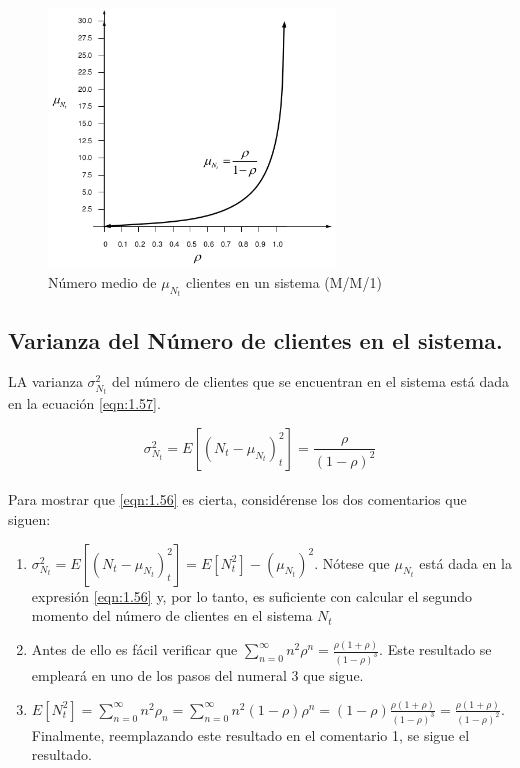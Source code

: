 \begin{figure}[H]
\centering
\includegraphics[width=3in]{chapters/chapter3/figures/Figura1-7:Numeromediodeclientesenunsistema.png}
\caption[Número medio de $ \mu_{N_{t}} $ clientes en un sistema (M/M/1)]{Número medio de $ \mu_{N_{t}} $ clientes en un sistema (M/M/1)}
\label{fig:mesh7}
\end{figure}    

\subsection{Varianza del Número de clientes en el sistema.}

LA varianza $ \sigma_{N_{t}}^{2} $ del número de clientes que se encuentran en el sistema está dada en la ecuación \ref{eqn:1.57}. 

\begin{equation}
    \sigma_{N_{t}}^{2}=E\left [ \left ( N_{t}-\mu _{N_{t}} \right )_{t}^{2} \right ]=\frac{\rho}{\left ( 1- \rho \right )^{2}}
    \label{eqn:1.57}
\end{equation}
\\
Para mostrar que \ref{eqn:1.56} es cierta, considérense los dos comentarios que siguen:

\begin{enumerate}
    \item $ \sigma_{N_{t}}^{2}=E\left [ \left ( N_{t}-\mu _{N_{t}} \right )_{t}^{2} \right ]= E\left [ N_{t}^{2} \right ]-\left ( \mu _{N_{t}} \right )^{2} $. Nótese que $ \mu _{N_{t}} $ está dada en la expresión \ref{eqn:1.56} y, por lo tanto, es suficiente con calcular el segundo momento del número de clientes en el sistema $ N_{t} $
    \item Antes de ello es fácil verificar que $ \displaystyle\sum_{n=0}^{\infty }n^{2}\rho^{n}=\frac{\rho \left ( 1+\rho \right )}{\left ( 1-\rho \right )^{3}} $. Este resultado se empleará en uno de los pasos del numeral 3 que sigue.
    \item $ E\left [ N_{t}^{2} \right ] = \displaystyle\sum_{n=0}^{\infty }n^{2}\rho_{n}= \sum_{n=0}^{\infty }n^{2}\left ( 1- \rho \right )\rho^{n}= \left ( 1- \rho \right )\frac{\rho \left ( 1+\rho \right )}{\left ( 1-\rho \right )^{3}}=\frac{\rho \left ( 1+\rho \right )}{\left ( 1-\rho \right )^{2}} $. Finalmente, reemplazando este resultado en el comentario 1, se sigue el resultado. 
\end{enumerate}

